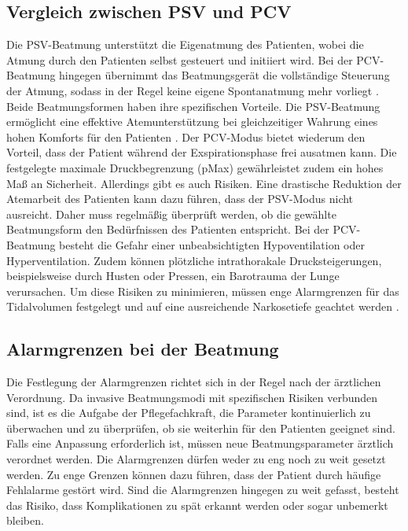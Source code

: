 \documentclass[a4paper,12pt]{article}
\begin{document}
\subsection{Vergleich zwischen PSV und PCV}

Die PSV-Beatmung unterstützt die Eigenatmung des Patienten, wobei die
Atmung durch den Patienten selbst gesteuert und initiiert wird.
Bei der PCV-Beatmung hingegen übernimmt das Beatmungsgerät die vollständige
Steuerung der Atmung, sodass in der Regel keine eigene Spontanatmung mehr
vorliegt \cite{PSVBeatmungDruckunterstuetzteBeatmung}.
Beide Beatmungsformen haben ihre spezifischen Vorteile. Die PSV-Beatmung
ermöglicht eine effektive Atemunterstützung bei gleichzeitiger Wahrung
eines hohen Komforts für den Patienten \cite{InvasiveUndNichtinvasive}.
Der PCV-Modus bietet wiederum den Vorteil,
dass der Patient während der Exspirationsphase frei ausatmen kann.
Die festgelegte maximale Druckbegrenzung (pMax) gewährleistet zudem
ein hohes Maß an Sicherheit.
Allerdings gibt es auch Risiken. Eine drastische Reduktion der Atemarbeit
des Patienten kann dazu führen, dass der PSV-Modus nicht ausreicht. Daher
muss regelmäßig überprüft werden, ob die gewählte Beatmungsform den
Bedürfnissen des Patienten entspricht. Bei der PCV-Beatmung besteht
die Gefahr einer unbeabsichtigten Hypoventilation oder Hyperventilation.
Zudem können plötzliche intrathorakale Drucksteigerungen, beispielsweise
durch Husten oder Pressen, ein Barotrauma der Lunge verursachen.
Um diese Risiken zu minimieren, müssen enge Alarmgrenzen für das
Tidalvolumen festgelegt und auf eine ausreichende Narkosetiefe geachtet
werden \cite{doccheckDruckkontrollierteBeatmung}.

\subsection{Alarmgrenzen bei der Beatmung}

Die Festlegung der Alarmgrenzen richtet sich in der Regel nach der
ärztlichen Verordnung. Da invasive Beatmungsmodi mit spezifischen Risiken
verbunden sind, ist es die Aufgabe der Pflegefachkraft, die Parameter
kontinuierlich zu überwachen und zu überprüfen, ob sie weiterhin für
den Patienten geeignet sind. Falls eine Anpassung erforderlich ist,
müssen neue Beatmungsparameter ärztlich verordnet werden.
Die Alarmgrenzen dürfen weder zu eng noch zu weit gesetzt werden.
Zu enge Grenzen können dazu führen, dass der Patient durch häufige
Fehlalarme gestört wird. Sind die Alarmgrenzen hingegen zu weit
gefasst, besteht das Risiko, dass Komplikationen zu spät erkannt
werden oder sogar unbemerkt bleiben.
\end{document}
